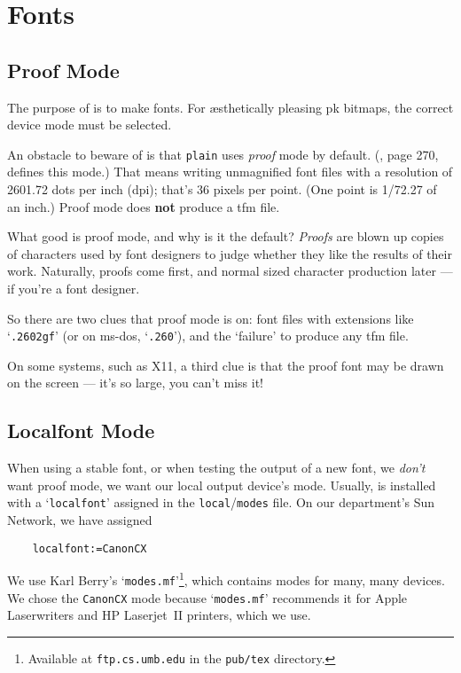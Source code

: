 \section{Fonts}\label{sec:fonts}


\subsection{Proof Mode}\label{sub:proof}

The purpose of \MF{} is to make fonts.  For \ae{}sthetically pleasing
{\sc pk} bitmaps, the correct device mode must be selected.

An obstacle to beware of is that {\tt plain} \MF{} uses
{\em proof\/} mode by default.
(\MFbook{}, page 270, defines this mode.)
That means writing unmagnified font files with a resolution of
2601.72 dots per inch (dpi); that's 36 pixels per point.  (One
point is 1/72.27 of an inch.)  Proof mode does {\bf not} produce a
{\sc tfm} file.

What good is proof mode, and why is it the default?
{\em Proofs\/} are blown up copies of characters used by font
designers to judge whether they like the results of their work.
Naturally, proofs come first, and normal sized character production
later --- if you're a font designer.

So there are two clues that proof mode is on:  font files with
extensions like `{\tt .2602gf}' (or on {\sc ms-dos}, `{\tt .260}'),
and the `failure' to produce any {\sc tfm} file.

On some systems, such as {\sc X11}, a third clue is that the proof
font may be drawn on the screen --- it's so large, you can't miss it!


\subsection{Localfont Mode}\label{sub:localfont}

When using a stable font, or when testing the output of a new font,
we {\em don't\/} want proof mode,
we want our local output device's mode.
Usually, \MF{} is installed with a `{\tt localfont}'
assigned in the {\tt local}/{\tt modes} file.
On our department's Sun Network, we have assigned
\begin{verbatim}
    localfont:=CanonCX
\end{verbatim}
We use Karl {\sc Berry\/}'s `{\tt modes.mf}'\footnote
{Available at {\tt ftp.cs.umb.edu} in the {\tt pub/tex} directory.},
which contains modes for many, many devices.  We chose the
{\tt CanonCX} mode because `{\tt modes.mf}' recommends it for Apple
Laserwriters and HP Laserjet~II printers, which we use.

